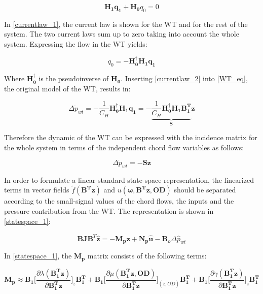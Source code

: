 \begin{equation}
 \bm{H_1}\bm{q_1} + \bm{H_0}q_0 = 0 
 \label{currentlaw_1}
\end{equation}

In \eqref{currentlaw_1}, the current law is shown for the WT and for the rest of the system. The two current laws sum up to zero taking into account the whole system. Expressing the flow in the WT yields:

\begin{equation}
q_0 = -\bm{H^{\dagger}_0}\bm{H_1}\bm{q_1}
 \label{currentlaw_2}
\end{equation}

Where $\bm{H^{\dagger}_0}$ is the pseudoinverse of $\bm{H_0}$. Inserting \eqref{currentlaw_2} into \eqref{WT_eq}, the original model of the WT, results in:

\begin{equation}
\Delta \dot{p}_{wt} = - \frac{1}{C_H} \bm{H^{\dagger}_0}\bm{H_1}\bm{q_1} = - \underbrace{\frac{1}{C_H} \bm{H^{\dagger}_0}\bm{H_1}\bm{{B_1^{T}}}}_{\bm{S}} \bm{z}
 \label{currentlaw_3}
\end{equation}

Therefore the dynamic of the WT can be expressed with the incidence matrix for the whole system in terms of the independent chord flow variables as follows: 

\begin{equation}
\Delta \dot{p}_{wt} = - \bm{S} \bm{z}
 \label{currentlaw_4}
\end{equation}

In order to formulate a linear standard state-space representation, the linearized terms in vector fields $\tilde f(\bm{B^T}\bm{z})$ and $u(\bm{\omega},\bm{B^T}\bm{z},\bm{OD})$ should be separated according to the small-signal values of the chord flows, the inputs and the pressure contribution from the WT. The representation is shown in \eqref{statespace_1}: 

\begin{equation}
 \bm{B}\bm{J {B}}^T \bm{\dot{\hat{z}}} = -\bm{M_p} \bm{\hat{z}} + \bm{N_p} \bm{\hat{u}} - \bm{B_o} \Delta \hat{p}_{wt}    
 \label{statespace_1}
\end{equation}

In \eqref{statespace_1}, the $\bm{M_p}$ matrix consists of the following terms: 

\begin{equation}
  \bm{M_p} \approx \bm{B_1} \bigg[ \frac{\partial{\lambda(\bm{{B_1^{T}}}\bm{z})}}{{\partial{\bm{{B_1^{T}}}\bm{z}}}}   \bigg]_{\bar{z}} \bm{{B_1^{T}}} +  \bm{B_1} \bigg[ \frac{\partial{\mu(\bm{{B_1^{T}}}\bm{z}, \bm{OD})}}{{\partial{\bm{{B_1^{T}}}\bm{z}}}}  \bigg]_{(\bar{z}, \bar{OD})} \bm{{B_1^{T}}} +  \bm{B_1} \bigg[ \frac{\partial{\gamma(\bm{{B_1^{T}}}\bm{z})}}{{\partial{\bm{{B_1^{T}}}\bm{z}}}}   \bigg]_{\bar{z}} \bm{{B_1^{T}}}
\label{Amatrix}
\end{equation}

